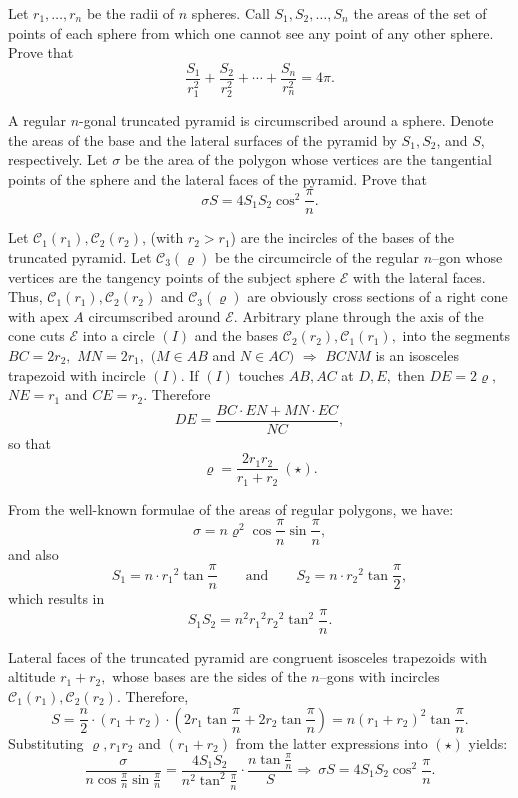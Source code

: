 \begin{question}[name={1982 IMO Longlist}]
	Let $r_1, \ldots , r_n$ be the radii of $n$ spheres. Call $S_1, S_2, \ldots , S_n$ the areas of the set of points of each sphere from which one cannot see any point of any other sphere. Prove that
	\[\frac{S_1}{r_1^2} + \frac{S_2}{r_2^2}+\cdots+\frac{S_n}{r_n^2} = 4 \pi.\]
\end{question}



\begin{question}[name={1982 IMO Longlist}]
	A regular $n$-gonal truncated pyramid is circumscribed around a sphere. Denote the areas of the base and the lateral surfaces of the pyramid by $S_1, S_2$, and $S$, respectively. Let $\sigma$ be the area of the polygon whose vertices are the tangential points of the sphere and the lateral faces of the pyramid. Prove that
	\[\sigma S = 4S_1S_2 \cos^2 \frac{\pi}{n}.\]
\end{question}

\begin{solution}[name={Solution by Luis González}]
	Let $\mathcal{C}_1(r_1),\mathcal{C}_2(r_2)$, (with $r_2 >r_1$) are the incircles of the bases of the truncated pyramid. Let $\mathcal{C}_3(\varrho)$ be the circumcircle of the regular $n$--gon whose vertices are the tangency points of the subject sphere $\mathcal{E}$ with the lateral faces. Thus, $\mathcal{C}_1(r_1),\mathcal{C}_2(r_2)$ and $\mathcal{C}_3(\varrho)$ are obviously cross sections of a right cone with apex $A$ circumscribed around $\mathcal{E}.$ Arbitrary plane through the axis of the cone cuts $\mathcal{E}$ into a circle $(I)$ and the bases $\mathcal{C}_2(r_2),\mathcal{C}_1(r_1) ,$ into the segments $BC=2r_2,$ $MN=2r_1,$ $(M \in AB$ and $N \in AC)$ $\Longrightarrow$ $BCNM$ is an isosceles trapezoid with incircle $(I).$ If $(I)$ touches $AB,AC$ at $D,E,$ then $DE=2\varrho, $ $NE=r_1$ and $CE=r_2.$ Therefore
	\[DE=\frac{BC \cdot EN+MN \cdot EC}{NC},\]
	so that \[\varrho= \frac{2r_1r_2}{r_1+r_2} \ (\star).\]
	
	From the well-known formulae of the areas of regular polygons, we have:
	$$\sigma=n\varrho^2\cos \frac{\pi}{n}\sin \frac{\pi}{n},$$
	and also
	$$S_1=n \cdot {r_1}^2\tan \frac{\pi}{n} \qquad \text{and} \qquad S_2=n \cdot {r_2}^2 \tan \frac{\pi}{2},$$
	which results in $$S_1S_2=n^2 {r_1}^2 {r_2}^2 \tan^2 \frac{\pi}{n}.$$
	
	Lateral faces of the truncated pyramid are congruent isosceles trapezoids with altitude $r_1+r_2,$ whose bases are the sides of the $n$--gons with incircles $\mathcal{C}_1(r_1),\mathcal{C}_2(r_2).$ Therefore,
	$$S=\frac{n}{2} \cdot (r_1+r_2) \cdot \left(2 r_1 \tan \frac{\pi}{n}+2 r_2 \tan \frac{\pi}{n} \right )=n(r_1+r_2)^2 \tan \frac{\pi}{n}.$$
	Substituting $\varrho, r_1r_2$ and $(r_1+r_2)$ from the latter expressions into $(\star)$ yields:
	$$\frac{\sigma}{n \cos \frac{\pi}{n} \sin \frac{\pi}{n}}=\frac{4S_1 S_2}{n^2 \tan^2 \frac{\pi}{n}} \cdot  \frac{n \tan \frac{\pi}{n}}{S} \Longrightarrow \ \sigma  S=4 S_1 S_2 \cos^2 \frac{\pi}{n}.$$
\end{solution}


